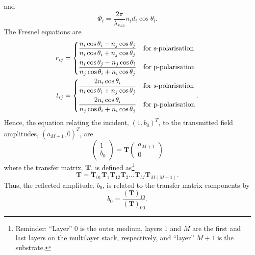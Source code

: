 \documentclass[]{article}
\begin{document}
	and 
	\begin{equation}
		\Phi_i=\frac{2\pi}{\lambda_\text{vac}}n_id_i\cos\theta_i.
	\end{equation}
	The Fresnel equations are 
	\begin{align}
		r_{ij}&=
		\begin{dcases}
			\frac{n_i \cos\theta_i - n_j \cos\theta_j}{n_i \cos\theta_i + n_j \cos\theta_j}&\text{for s-polarisation}\\
			\frac{n_i \cos\theta_j-n_j \cos\theta_i}{n_j \cos\theta_i + n_i \cos\theta_j}&\text{for p-polarisation}
		\end{dcases}\\
		t_{ij}&=
		\begin{dcases}
			\frac{2 n_i \cos\theta_i}{n_i \cos\theta_i + n_j \cos\theta_j}&\text{for s-polarisation}\\
			\frac{2 n_i \cos\theta_i}{n_j \cos\theta_i + n_i \cos\theta_j}&\text{for p-polarisation}
		\end{dcases}.
	\end{align}
	Hence, the equation relating the incident, $(1, b_0)^T$, to the transmitted field amplitudes, $(a_{M+1},0)^T$, are
	\begin{equation}
		\begin{pmatrix}
			1\\b_0
		\end{pmatrix}=
		\mathbf{T}
		\begin{pmatrix}
			a_{M+1}\\0
		\end{pmatrix}
	\end{equation}
	where the transfer matrix, $\mathbf{T}$, is defined as\footnote{Reminder: ``Layer'' $0$ is the outer medium, layers $1$ and $M$ are the first and last layers on the multilayer stack, respectively, and ``layer'' $M+1$ is the substrate.}
	\begin{equation}
		\mathbf{T}=\mathbf{T}_{01}\mathbf{T}_1\mathbf{T}_{12}\mathbf{T}_2\dots\mathbf{T}_{M}\mathbf{T}_{M(M+1)}.
	\end{equation}
	Thus, the reflected amplitude, $b_0$, is related to the transfer matrix components by
	\begin{equation}
		b_0=\frac{(\mathbf{T})_{10}}{(\mathbf{T})_{00}}.
	\end{equation}

%
%

	
%	
%	
	
\end{document}
